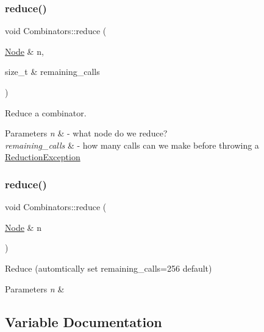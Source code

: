 \subsubsection{\texorpdfstring{reduce()}{reduce()}\hspace{0.1cm}{\footnotesize\ttfamily [1/2]}}
{\footnotesize\ttfamily void Combinators\+::reduce (\begin{DoxyParamCaption}\item[{\hyperlink{class_node}{Node} \&}]{n,  }\item[{size\+\_\+t \&}]{remaining\+\_\+calls }\end{DoxyParamCaption})}



Reduce a combinator. 


\begin{DoxyParams}{Parameters}
{\em n} & -\/ what node do we reduce? \\
\hline
{\em remaining\+\_\+calls} & -\/ how many calls can we make before throwing a \hyperlink{class_combinators_1_1_reduction_exception}{Reduction\+Exception} \\
\hline
\end{DoxyParams}
\mbox{\label{namespace_combinators_a10b79cf8cc79cd5505e8d3c70470aab7}} 
\subsubsection{\texorpdfstring{reduce()}{reduce()}\hspace{0.1cm}{\footnotesize\ttfamily [2/2]}}
{\footnotesize\ttfamily void Combinators\+::reduce (\begin{DoxyParamCaption}\item[{\hyperlink{class_node}{Node} \&}]{n }\end{DoxyParamCaption})}



Reduce (automtically set remaining\+\_\+calls=256 default) 


\begin{DoxyParams}{Parameters}
{\em n} & \\
\hline
\end{DoxyParams}


\subsection{Variable Documentation}
\mbox{\label{namespace_combinators_a47aa4c813bc5305c8b818c9be952235c}} 
